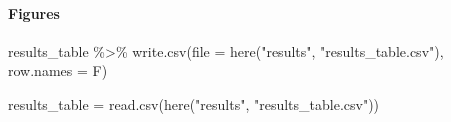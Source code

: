\documentclass[
]{article}
\newenvironment{Shaded}{\begin{snugshade}}{\end{snugshade}}
\newcommand{\AttributeTok}[1]{\textcolor[rgb]{0.77,0.63,0.00}{#1}}
\newcommand{\FunctionTok}[1]{\textcolor[rgb]{0.00,0.00,0.00}{#1}}
\newcommand{\NormalTok}[1]{#1}
\newcommand{\OtherTok}[1]{\textcolor[rgb]{0.56,0.35,0.01}{#1}}
\newcommand{\SpecialCharTok}[1]{\textcolor[rgb]{0.00,0.00,0.00}{#1}}
\newcommand{\StringTok}[1]{\textcolor[rgb]{0.31,0.60,0.02}{#1}}
\begin{document}
\hypertarget{figures}{%
\paragraph{Figures}\label{figures}}

\begin{Shaded}
\begin{Highlighting}[]
\NormalTok{results\_table }\SpecialCharTok{\%\textgreater{}\%}
  \FunctionTok{write.csv}\NormalTok{(}\AttributeTok{file =} \FunctionTok{here}\NormalTok{(}\StringTok{"results"}\NormalTok{, }\StringTok{"results\_table.csv"}\NormalTok{), }
            \AttributeTok{row.names =}\NormalTok{ F)}
\end{Highlighting}
\end{Shaded}

\begin{Shaded}
\begin{Highlighting}[]
\NormalTok{results\_table }\OtherTok{=} \FunctionTok{read.csv}\NormalTok{(}\FunctionTok{here}\NormalTok{(}\StringTok{"results"}\NormalTok{, }\StringTok{"results\_table.csv"}\NormalTok{))}


\end{Highlighting}
\end{Shaded}
\end{document}
